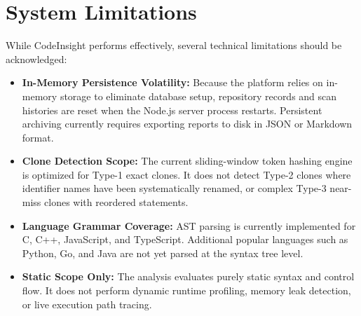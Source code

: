 \section{System Limitations}
While CodeInsight performs effectively, several technical limitations should be acknowledged:
\begin{itemize}
    \item \textbf{In-Memory Persistence Volatility:} Because the platform relies on in-memory storage to eliminate database setup, repository records and scan histories are reset when the Node.js server process restarts. Persistent archiving currently requires exporting reports to disk in JSON or Markdown format.
    \item \textbf{Clone Detection Scope:} The current sliding-window token hashing engine is optimized for Type-1 exact clones. It does not detect Type-2 clones where identifier names have been systematically renamed, or complex Type-3 near-miss clones with reordered statements.
    \item \textbf{Language Grammar Coverage:} AST parsing is currently implemented for C, C++, JavaScript, and TypeScript. Additional popular languages such as Python, Go, and Java are not yet parsed at the syntax tree level.
    \item \textbf{Static Scope Only:} The analysis evaluates purely static syntax and control flow. It does not perform dynamic runtime profiling, memory leak detection, or live execution path tracing.
\end{itemize}

